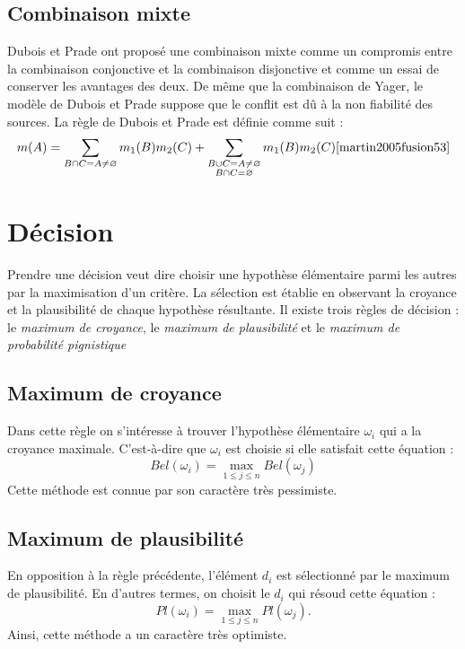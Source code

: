 \subsection{Combinaison mixte}

Dubois et Prade ont proposé une combinaison mixte comme un compromis entre la
combinaison conjonctive et la combinaison disjonctive et comme un essai de conserver
les avantages des deux. De même que la combinaison de Yager, le modèle de Dubois
et Prade suppose que le conflit est dû à la non fiabilité des sources. La règle de
Dubois et Prade est définie comme suit :
\begin{equation}
m(A) = \sum_{B \cap C = A \neq \varnothing} m_1(B) m_2(C) +
\sum_{\substack{B \cup C = A \neq \varnothing \\ B \cap C = \varnothing}} m_1(B) m_2(C) \cite{martin2005fusion53}
\end{equation}

\section{Décision}

Prendre une décision veut dire choisir une hypothèse élémentaire parmi les autres
par la maximisation d'un critère. La sélection est établie en observant
la croyance et la plausibilité de chaque hypothèse résultante. Il existe trois règles
de décision : le \emph{maximum de croyance}, le \emph{maximum de plausibilité} et le
\emph{maximum de probabilité pignistique}

\subsection{Maximum de croyance}

Dans cette règle on s'intéresse à trouver l'hypothèse élémentaire $\omega_i$ qui
a la croyance maximale. C'est-à-dire que $\omega_i$ est choisie si elle satisfait cette
équation :
\begin{equation}
Bel(\omega_i) = \max_{1 \leq j \leq n} Bel(\omega_j)
\end{equation}
Cette méthode est connue par son caractère très pessimiste.

\subsection{Maximum de plausibilité}

En opposition à la règle précédente, l'élément $d_i$ est sélectionné par le maximum
de plausibilité. En d'autres termes, on choisit le $d_i$ qui résoud cette équation :
\begin{equation}
Pl(\omega_i) = \max_{1 \leq j \leq n} Pl(\omega_j).
\end{equation}
Ainsi, cette méthode a un caractère très optimiste.\cite{kZebouchiThesis36}

